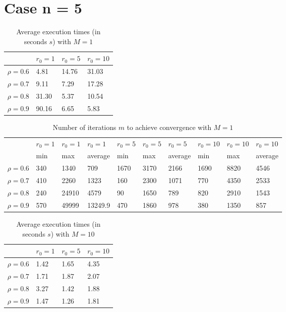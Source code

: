 \documentclass[a4paper,11pt,openright]{report}
\begin{document}
\section*{Case n = 5} 
\begin{table}[H]
\centering
\addtolength{\leftskip}{-1.5cm}
\addtolength{\rightskip}{-1.5cm}
\begin{tabular}{|c|lll|}
\hline
$ $ & $r_0 = 1$ & $r_0 = 5$ & $r_0 = 10$ \\
\hline
$\rho = 0.6$ & 4.81 & 14.76 & 31.03 \\

$\rho = 0.7$ & 9.11 & 7.29 & 17.28 \\

$\rho = 0.8$ & 31.30 & 5.37 & 10.54 \\

$\rho = 0.9$ & 90.16 & 6.65 & 5.83 \\
\hline
\end{tabular}
\caption{Average execution
 times (in seconds $s$) with $M = 1$}
\end{table}
\begin{table}[H]
\centering
\addtolength{\leftskip}{-1.5cm}
\addtolength{\rightskip}{-1.5cm}
\begin{tabular}{|c|lllllllll|}
\hline
$ $ & $r_0 = 1$ & $r_0 = 1$ & $r_0 = 1$ & $r_0 = 5$ & $r_0 = 5$ & $r_0 = 5$ & $r_0 = 10$ & $r_0 = 10$ & $r_0 = 10$  \\
$ $ & min & max & average & min & max & average & min & max & average \\ 
\hline
$\rho = 0.6$ & 340 & 1340 & 709 & 1670 & 3170 & 2166 & 1690 & 8820 & 4546 \\

$\rho = 0.7$ & 410 & 2260 & 1323 & 160 & 2300 & 1071 & 770 & 4350 & 2533\\

$\rho = 0.8$ & 240 & 24910 & 4579 & 90 & 1650 & 789 & 820 & 2910 & 1543\\

$\rho = 0.9$ & 570 & 49999 & 13249.9 & 470 & 1860 & 978 & 380 & 1350 & 857\\
\hline
\end{tabular}
\caption{Number of iterations $m$ to achieve convergence with $M = 1$}
\end{table}
\begin{table}[H]
\centering
\addtolength{\leftskip}{-1.5cm}
\addtolength{\rightskip}{-1.5cm}
\begin{tabular}{|c|lll|}
\hline
$ $ & $r_0 = 1$ & $r_0 = 5$ & $r_0 = 10$ \\
\hline
$\rho = 0.6$ & 1.42 & 1.65 & 4.35 \\

$\rho = 0.7$ & 1.71 & 1.87 &  2.07 \\

$\rho = 0.8$ & 3.27 & 1.42 & 1.88 \\

$\rho = 0.9$ & 1.47 & 1.26 & 1.81 \\
\hline
\end{tabular}
\caption{Average execution
 times (in seconds $s$) with $M = 10$}
\end{table}
\end{document}
